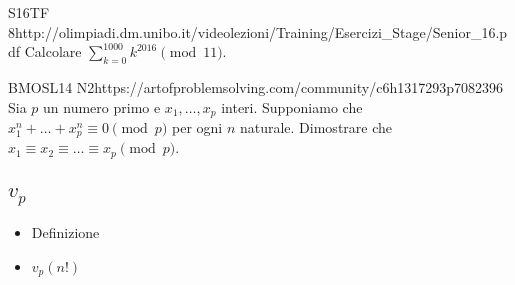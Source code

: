 \documentclass[12pt]{article}
\begin{document}
\begin{esercizio}{S16TF 8}{http://olimpiadi.dm.unibo.it/videolezioni/Training/Esercizi_Stage/Senior_16.pdf}
    Calcolare $\sum_{k=0}^{1000} k^{2016}\pmod{11}$.
\end{esercizio}

\begin{esercizio}{BMOSL14 N2}{https://artofproblemsolving.com/community/c6h1317293p7082396}
    Sia $p$ un numero primo e $x_1,\dots,x_p$ interi. Supponiamo che $x_1^n+\dots+x_p^n\equiv0\pmod p$ per ogni $n$ naturale. Dimostrare che $x_1\equiv x_2\equiv\dots\equiv x_p\pmod p$.
\end{esercizio}

\subsection{$v_{p}$}
\begin{itemize}
	\item Definizione
	\item $v_{p}(n!)$
\end{itemize}





%
\end{document}
